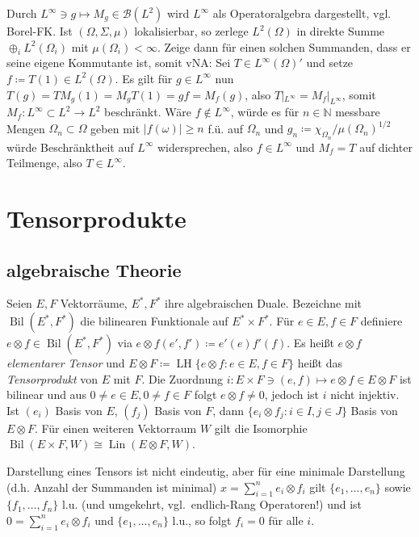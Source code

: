 \documentclass[11pt,a4paper]{scrartcl}
\newcommand{\N}{\mathbb{N}} %
\newcommand{\B}{\mathcal{B}}
\theoremstyle{plain}
\theoremstyle{definition}
\theoremstyle{remark}
\DeclareMathOperator{\Bil}{Bil}
\DeclareMathOperator{\Lin}{Lin}
\DeclareMathOperator{\LH}{LH}
\begin{document}
Durch $L^\infty \ni g \mapsto M_g \in \B(L^2)$ wird $L^\infty$ als Operatoralgebra dargestellt, vgl. Borel-FK\@. Ist $(\Omega,\Sigma,\mu)$ lokalisierbar, so zerlege $L^2(\Omega)$ in direkte Summe $\oplus_i L^2(\Omega_i)$ mit $\mu(\Omega_i) < \infty$. Zeige dann für einen solchen Summanden, dass er seine eigene Kommutante ist, somit vNA: Sei $T\in L^\infty(\Omega)'$ und setze $f\coloneqq T(1)\in L^2(\Omega)$. Es gilt für $g\in L^\infty$ nun $T(g)=TM_g(1)=M_gT(1)=gf=M_f(g)$, also $T|_{L^\infty}=M_f|_{L^\infty}$, somit $M_f: L^\infty \subset L^2 \to L^2$ beschränkt. Wäre $f\not\in L^\infty$, würde es für $n\in \N$ messbare Mengen $\Omega_n \subset \Omega$ geben mit $|f(\omega)| \geq n$ f.ü. auf $\Omega_n$ und $g_n\coloneqq \chi_{\Omega_n}/\mu(\Omega_n)^{1/2}$ würde Beschränktheit auf $L^\infty$ widersprechen, also $f\in L^\infty$ und $M_f=T$ auf dichter Teilmenge, also $T\in L^\infty$.

\section{Tensorprodukte}

\subsection{algebraische Theorie}

Seien $E,F$ Vektorräume, $E^*,F^*$ ihre algebraischen Duale. Bezeichne mit $\Bil(E^*,F^*)$ die bilinearen Funktionale auf $E^*\times F^*$. Für $e\in E, f\in F$ definiere $e\otimes f\in \Bil(E^*, F^*)$ via $e\otimes f(e',f')\coloneqq e'(e)f'(f)$. Es heißt $e\otimes f$ \emph{elementarer Tensor} und $E\otimes F\coloneqq \LH \{e\otimes f: e\in E, f\in F\}$ heißt das \emph{Tensorprodukt} von $E$ mit $F$. Die Zuordnung $i: E\times F \ni (e,f) \mapsto e\otimes f \in E\otimes F$ ist bilinear und aus $0\neq e\in E, 0\neq f\in F$ folgt $e\otimes f \neq 0$, jedoch ist $i$ nicht injektiv. Ist $(e_i)$ Basis von $E$, $(f_j)$ Basis von $F$, dann $\{e_i\otimes f_j: i\in I, j\in J\}$ Basis von $E\otimes F$. Für einen weiteren Vektorraum $W$ gilt die Isomorphie $\Bil(E\times F, W)\cong \Lin(E\otimes F, W)$.

Darstellung eines Tensors ist nicht eindeutig, aber für eine minimale Darstellung (d.h. Anzahl der Summanden ist minimal) $x=\sum_{i=1}^n e_i\otimes f_i$ gilt $\{e_1,\dots,e_n\}$ sowie $\{f_1,\dots,f_n\}$ l.u. (und umgekehrt, vgl.\ endlich-Rang Operatoren!) und ist $0=\sum_{i=1}^n e_i\otimes f_i$ und $\{e_1,\dots,e_n\}$ l.u., so folgt $f_i=0$ für alle $i$.
\end{document}
